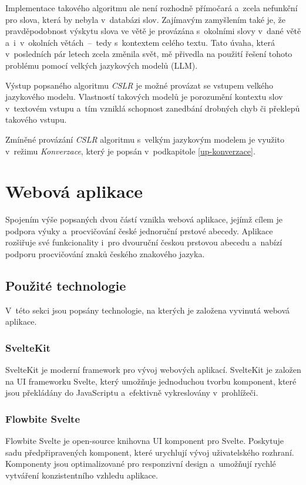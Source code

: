 \documentclass[
  master,
  program=ainfvs,
  biblatex,
  figures=true,
  tables=false,
  sourcecodes=true,
  glossaries,
  index
]{kidiplom}
\begin{document}
        Implementace takového algoritmu ale není rozhodně přímočará a~zcela nefunkční pro slova, která by nebyla v~databázi slov. Zajímavým zamyšlením také je, že pravděpodobnost výskytu slova ve větě je provázána s~okolními slovy v~dané větě a~i~v~okolních větách~--~tedy s~kontextem celého textu. Tato úvaha, která v~posledních pár letech zcela změnila svět, mě přivedla na použití řešení tohoto problému pomocí velkých jazykových modelů (LLM).
        
        Výstup popsaného algoritmu \emph{CSLR} je možné provázat se vstupem velkého jazykového modelu. Vlastností takových modelů je porozumění kontextu slov v~textovém vstupu a~tím vzniklá schopnost zanedbání drobných chyb či překlepů takového vstupu.

        Zmíněné provázání \emph{CSLR} algoritmu s~velkým jazykovým modelem je využito v~režimu \emph{Konverzace}, který je popsán v~podkapitole \ref{up-konverzace}.


\clearpage


\section{Webová aplikace} \label{webova-aplikace}
    Spojením výše popsaných dvou částí vznikla webová aplikace, jejímž cílem je podpora výuky a~procvičování české jednoruční prstové abecedy. Aplikace rozšiřuje své funkcionality i~pro dvouruční českou prstovou abecedu a~nabízí podporu procvičování znaků českého znakového jazyka.

    \subsection{Použité technologie}
        V~této sekci jsou popsány technologie, na kterých je založena vyvinutá webová aplikace.
        
        \subsubsection{SvelteKit}
            SvelteKit je moderní framework pro vývoj webových aplikací. SvelteKit je založen na UI frameworku Svelte, který umožňuje jednoduchou tvorbu komponent, které jsou překládány do JavaScriptu a~efektivně vykreslovány v~prohlížeči. \cite{svelte}
    
        \subsubsection{Flowbite Svelte}
            Flowbite Svelte je open-source knihovna UI komponent pro Svelte. Poskytuje sadu předpřipravených komponent, které urychlují vývoj uživatelského rozhraní. Komponenty jsou optimalizované pro responzivní design a~umožňují rychlé vytváření konzistentního vzhledu aplikace. \cite{flowbite}
        
\end{document}
